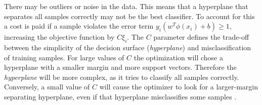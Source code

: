 There may be outliers or noise in the data. This means that a hyperplane that separates all samples correctly may not be the best classifier. To account for this a cost is paid if a sample violates the error term \(y_{i}\left ( w^{T}\phi \left ( x_{i} \right )+b \right )\geq 1\), increasing the objective function by \(C \xi_{i}\). The $C$ parameter defines the trade-off between the simplicity of the decision surface (\emph{hyperplane}) and misclassification of training samples. For large values of $C$ the optimization will chose a hyperplane with a smaller margin and more support vectors. Therefore the \emph{hyperplane} will be more complex, as it tries to classify all samples correctly. Conversely, a small value of $C$ will cause the optimizer to look for a larger-margin separating hyperplane, even if that hyperplane misclassifies some samples \cite{crossValidatedSVMC}.

